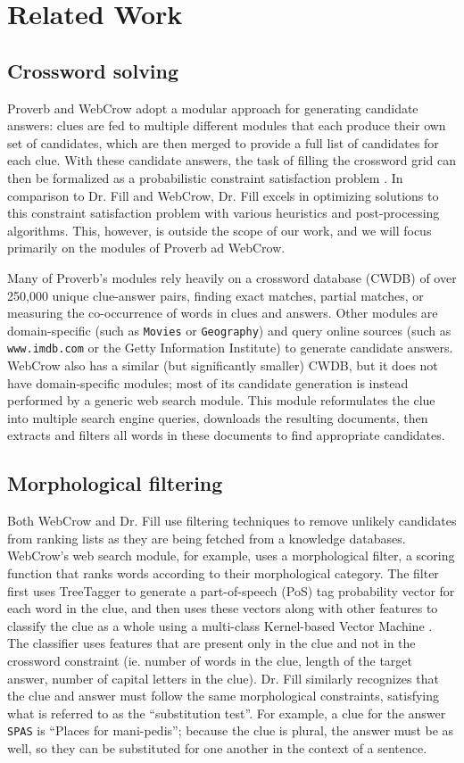 \documentclass[11pt]{article}
\begin{document}
\section{Related Work}
\subsection{Crossword solving}
Proverb and WebCrow adopt a modular approach for generating candidate answers: clues are fed to multiple different modules that each produce their own set of candidates, which are then merged to provide a full list of candidates for each clue. With these candidate answers, the task of filling the crossword grid can then be formalized as a probabilistic constraint satisfaction problem \cite{Shazeer99-Solving}. In comparison to Dr. Fill and WebCrow, Dr. Fill excels in optimizing solutions to this constraint satisfaction problem with various heuristics and post-processing algorithms. This, however, is outside the scope of our work, and we will focus primarily on the modules of Proverb ad WebCrow.

Many of Proverb's modules rely heavily on a crossword database (CWDB) of over 250,000 unique clue-answer pairs, finding exact matches, partial matches, or measuring the co-occurrence of words in clues and answers. Other modules are domain-specific (such as \verb.Movies. or \verb.Geography.) and query online sources (such as \verb,www.imdb.com, or the Getty Information Institute) to generate candidate answers. WebCrow also has a similar (but significantly smaller) CWDB, but it does not have domain-specific modules; most of its candidate generation is instead performed by a generic web search module. This module reformulates the clue into multiple search engine queries, downloads the resulting documents, then extracts and filters all words in these documents to find appropriate candidates.

\subsection{Morphological filtering}
Both WebCrow and Dr. Fill use filtering techniques to remove unlikely candidates from ranking lists as they are being fetched from a knowledge databases. WebCrow's web search module, for example, uses a morphological filter, a scoring function that ranks words according to their morphological category. The filter first uses TreeTagger \cite{Schmid95-Improvements} to generate a part-of-speech (PoS) tag probability vector for each word in the clue, and then uses these vectors along with other features to classify the clue as a whole using a multi-class Kernel-based Vector Machine \cite{Tsochantaridis04-Support}. The classifier uses features that are present only in the clue and not in the crossword constraint (ie. number of words in the clue, length of the target answer, number of capital letters in the clue). Dr. Fill similarly recognizes that the clue and answer must follow the same morphological constraints, satisfying what is referred to as the ``substitution test''. For example, a clue for the answer \verb.SPAS. is ``Places for mani-pedis''; because the clue is plural, the answer must be as well, so they can be substituted for one another in the context of a sentence.
\end{document}
